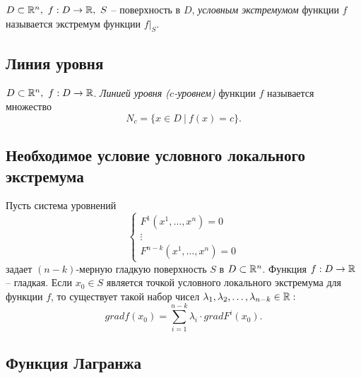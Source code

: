 \begin{definition}
    $ D \subset \R^n, \ f:D\rightarrow\R, \ S $ -- поверхность в $D$, \emph{условным экстремумом} функции $f$ называется экстремум функции $f\big|_S$.
\end{definition}

\subsection{Линия уровня}

\begin{definition}
    $D \subset \R^n, \ f:D\rightarrow\R$. \emph{Линией уровня ($c$-уровнем)} функции $f$ называется множество
    \[
        N_c = \big\{x\in D \ \big| \ f(x) = c\big\}.
    \]
\end{definition}

\newpage

\subsection{Необходимое условие условного локального экстремума}

\begin{theorem}
    Пусть система уровнений
    \begin{equation}\label{eq:20}
        \left\{\begin{array}{l}
            F^1(x^1,\ldots,x^n) = 0 \\
            \vdots                  \\
            F^{n-k}(x^1,\ldots,x^n) = 0
        \end{array}\right.
    \end{equation}
    задает $(n-k)$-мерную гладкую поверхность $S$ в $D \subset \mathbb{R}^n $. Функция $f:D\rightarrow\mathbb{R}$ -- гладкая. Если $x_0 \in S$ является точкой условного локального экстремума для функции $f$, то существует такой набор чисел $\lambda_1,\lambda_2,\ldots,\lambda_{n-k} \in \mathbb{R}:$
    \[
        grad f(x_0) = \sum_{i = 1}^{n-k}\lambda_i \cdot grad F^i(x_0).
    \]
\end{theorem}

\subsection{Функция Лагранжа}

